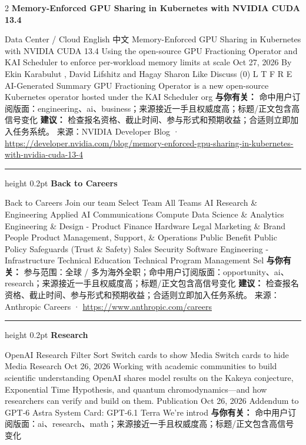 \documentclass[10.5pt]{ctexart}
\begin{document}
\begin{multicols}{2}
{\large\bfseries Memory-Enforced GPU Sharing in Kubernetes with NVIDIA CUDA 13.4}\par
Data Center / Cloud English 中文 Memory-Enforced GPU Sharing in Kubernetes with NVIDIA CUDA 13.4 Using the open-source GPU Fractioning Operator and KAI Scheduler to enforce per-workload memory limits at scale Oct 27, 2026 By Ekin Karabulut , David Lifshitz and Hagay Sharon Like Discuss (0) L T F R E AI-Generated Summary GPU Fractioning Operator is a new open-source Kubernetes operator hosted under the KAI Scheduler org
\textbf{与你有关：} 命中用户订阅版面：engineering、ai、business；来源接近一手且权威度高；标题/正文包含高信号变化
\textbf{建议：} 检查报名资格、截止时间、参与形式和预期收益；合适则立即加入任务系统。
{\footnotesize\color{ormuted} 来源：NVIDIA Developer Blog · \url{https://developer.nvidia.com/blog/memory-enforced-gpu-sharing-in-kubernetes-with-nvidia-cuda-13-4}}
\vspace{2mm}
\hrule height 0.2pt
\vspace{2mm}
{\large\bfseries Back to Careers}\par
Back to Careers Join our team Select Team All Teams AI Research \& Engineering Applied AI Communications Compute Data Science \& Analytics Engineering \& Design - Product Finance Hardware Legal Marketing \& Brand People Product Management, Support, \& Operations Public Benefit Public Policy Safeguards (Trust \& Safety) Sales Security Software Engineering - Infrastructure Technical Education Technical Program Management Sel
\textbf{与你有关：} 参与范围：全球 / 多为海外全职；命中用户订阅版面：opportunity、ai、research；来源接近一手且权威度高；标题/正文包含高信号变化
\textbf{建议：} 检查报名资格、截止时间、参与形式和预期收益；合适则立即加入任务系统。
{\footnotesize\color{ormuted} 来源：Anthropic Careers · \url{https://www.anthropic.com/careers}}
\vspace{2mm}
\hrule height 0.2pt
\vspace{2mm}
{\large\bfseries Research}\par
OpenAI Research Filter Sort Switch cards to show Media Switch cards to hide Media Research Oct 26, 2026 Working with academic communities to build scientific understanding OpenAI shares model results on the Kakeya conjecture, Exponential Time Hypothesis, and quantum chromodynamics—and how researchers can verify and build on them. Publication Oct 26, 2026 Addendum to GPT‑6 Astra System Card: GPT‑6.1 Terra We’re introd
\textbf{与你有关：} 命中用户订阅版面：ai、research、math；来源接近一手且权威度高；标题/正文包含高信号变化

\end{multicols}
\end{document}
